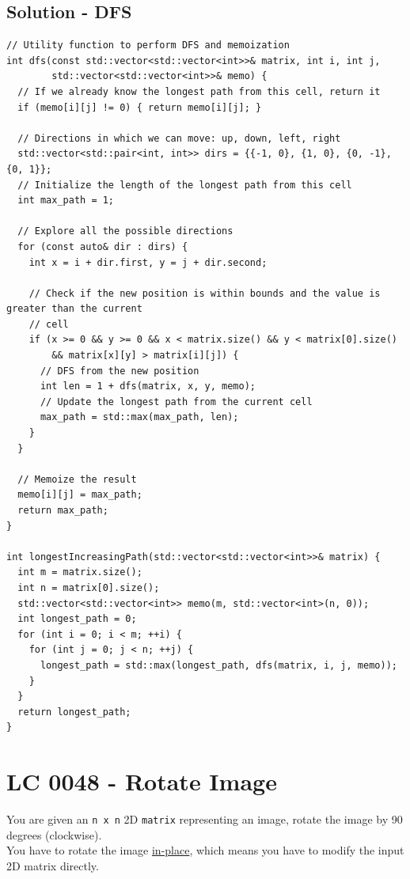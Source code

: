 \subsection*{Solution - DFS}
\begin{lstlisting}
// Utility function to perform DFS and memoization
int dfs(const std::vector<std::vector<int>>& matrix, int i, int j,
        std::vector<std::vector<int>>& memo) {
  // If we already know the longest path from this cell, return it
  if (memo[i][j] != 0) { return memo[i][j]; }

  // Directions in which we can move: up, down, left, right
  std::vector<std::pair<int, int>> dirs = {{-1, 0}, {1, 0}, {0, -1}, {0, 1}};
  // Initialize the length of the longest path from this cell
  int max_path = 1;

  // Explore all the possible directions
  for (const auto& dir : dirs) {
    int x = i + dir.first, y = j + dir.second;

    // Check if the new position is within bounds and the value is greater than the current
    // cell
    if (x >= 0 && y >= 0 && x < matrix.size() && y < matrix[0].size()
        && matrix[x][y] > matrix[i][j]) {
      // DFS from the new position
      int len = 1 + dfs(matrix, x, y, memo);
      // Update the longest path from the current cell
      max_path = std::max(max_path, len);
    }
  }

  // Memoize the result
  memo[i][j] = max_path;
  return max_path;
}

int longestIncreasingPath(std::vector<std::vector<int>>& matrix) {
  int m = matrix.size();
  int n = matrix[0].size();
  std::vector<std::vector<int>> memo(m, std::vector<int>(n, 0));
  int longest_path = 0;
  for (int i = 0; i < m; ++i) {
    for (int j = 0; j < n; ++j) {
      longest_path = std::max(longest_path, dfs(matrix, i, j, memo));
    }
  }
  return longest_path;
}
\end{lstlisting}

\section{LC 0048 - Rotate Image}
You are given an {\colorbox{CodeBackground}{\lstinline|n x n|}} 2D {\colorbox{CodeBackground}{\lstinline|matrix|}} representing an image, rotate the image by 90 degrees (clockwise).\\

You have to rotate the image \ul{in-place}, which means you have to modify the input 2D matrix directly.

